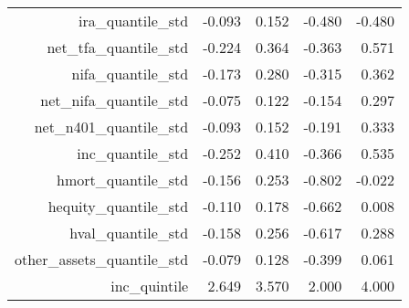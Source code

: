 \begin{table}[ht]
\begin{tabular}{rrrrr}
  ira\_quantile\_std & -0.093 & 0.152 & -0.480 & -0.480 \\ 
  net\_tfa\_quantile\_std & -0.224 & 0.364 & -0.363 & 0.571 \\ 
  nifa\_quantile\_std & -0.173 & 0.280 & -0.315 & 0.362 \\ 
  net\_nifa\_quantile\_std & -0.075 & 0.122 & -0.154 & 0.297 \\ 
  net\_n401\_quantile\_std & -0.093 & 0.152 & -0.191 & 0.333 \\ 
  inc\_quantile\_std & -0.252 & 0.410 & -0.366 & 0.535 \\ 
  hmort\_quantile\_std & -0.156 & 0.253 & -0.802 & -0.022 \\ 
  hequity\_quantile\_std & -0.110 & 0.178 & -0.662 & 0.008 \\ 
  hval\_quantile\_std & -0.158 & 0.256 & -0.617 & 0.288 \\ 
  other\_assets\_quantile\_std & -0.079 & 0.128 & -0.399 & 0.061 \\ 
  inc\_quintile & 2.649 & 3.570 & 2.000 & 4.000 \\ 
   \hline
\end{tabular}
\end{table}
